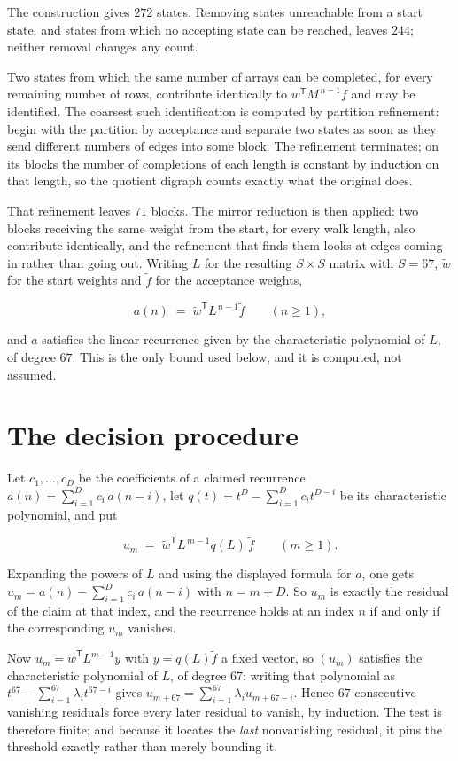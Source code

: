 \documentclass[11pt]{article}
\theoremstyle{definition}
\begin{document}
The construction gives $272$ states. Removing states unreachable from a start state, and states from which no accepting state can be reached, leaves $244$; neither removal changes any count.

Two states from which the same number of arrays can be completed, for every remaining number of rows, contribute identically to $w^{\mathsf T}M^{\,n-1}f$ and may be identified. The coarsest such identification is computed by partition refinement: begin with the partition by acceptance and separate two states as soon as they send different numbers of edges into some block. The refinement terminates; on its blocks the number of completions of each length is constant by induction on that length, so the quotient digraph counts exactly what the original does.

That refinement leaves $71$ blocks. The mirror reduction is then applied: two blocks receiving the same weight from the start, for every walk length, also contribute identically, and the refinement that finds them looks at edges coming in rather than going out. Writing $L$ for the resulting $S \times S$ matrix with $S = 67$, $\tilde w$ for the start weights and $\tilde f$ for the acceptance weights,

\[a(n) \;=\; \tilde w^{\mathsf T} L^{\,n-1} \tilde f \qquad (n \ge 1),\]

and $a$ satisfies the linear recurrence given by the characteristic polynomial of $L$, of degree $67$. This is the only bound used below, and it is computed, not assumed.

\section{The decision procedure}

Let $c_1,\dots,c_D$ be the coefficients of a claimed recurrence $a(n) = \sum_{i=1}^{D} c_i\,a(n-i)$, let $q(t) = t^{D} - \sum_{i=1}^{D} c_i t^{D-i}$ be its characteristic polynomial, and put

\[u_m \;=\; \tilde w^{\mathsf T} L^{\,m-1} q(L)\,\tilde f \qquad (m \ge 1).\]

Expanding the powers of $L$ and using the displayed formula for $a$, one gets $u_m = a(n) - \sum_{i=1}^{D} c_i\,a(n-i)$ with $n = m + D$. So $u_m$ is exactly the residual of the claim at that index, and the recurrence holds at an index $n$ if and only if the corresponding $u_m$ vanishes.

Now $u_m = \tilde w^{\mathsf T} L^{m-1} y$ with $y = q(L)\tilde f$ a fixed vector, so $(u_m)$ satisfies the characteristic polynomial of $L$, of degree $67$: writing that polynomial as $t^{67} - \sum_{i=1}^{67} \lambda_i t^{67-i}$ gives $u_{m+67} = \sum_{i=1}^{67} \lambda_i u_{m+67-i}$. Hence $67$ consecutive vanishing residuals force every later residual to vanish, by induction. The test is therefore finite; and because it locates the {\itshape last} nonvanishing residual, it pins the threshold exactly rather than merely bounding it.
\end{document}

